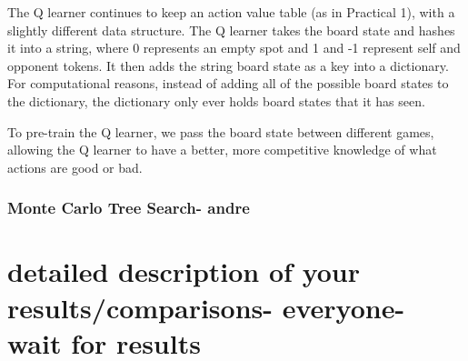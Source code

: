 \documentclass[12pt]{article}
\begin{document}
The Q learner continues to keep an action value table (as in Practical 1), with a slightly different data structure. The Q learner takes the board state and hashes it into a string, where 0 represents an empty spot and 1 and -1 represent self and opponent tokens. It then adds the string board state as a key into a dictionary. For computational reasons, instead of adding all of the possible board states to the dictionary, the dictionary only ever holds board states that it has seen. 

To pre-train the Q learner, we pass the board state between different games, allowing the Q learner to have a better, more competitive knowledge of what actions are good or bad.

\subsubsection{Monte Carlo Tree Search- andre} 


\section{detailed description of your results/comparisons- everyone- wait for results}
\end{document}
